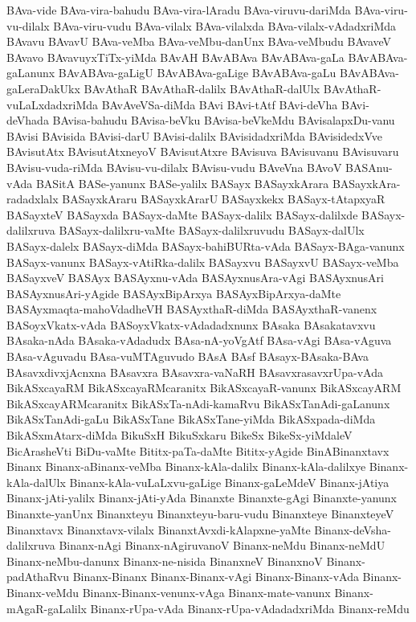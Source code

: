 {BAva-vide
BAva-vira-bahudu
BAva-vira-lAradu
BAva-viruvu-dariMda
BAva-viru-vu-dilalx
BAva-viru-vudu
BAva-vilalx
BAva-vilalxda
BAva-vilalx-vAdadxriMda
BAvavu
BAvavU
BAva-veMba
BAva-veMbu-danUnx
BAva-veMbudu
BAvaveV
BAvavo
BAvavuyxTiTx-yiMda
BAvAH
BAvABAva
BAvABAva-gaLa
BAvABAva-gaLanunx
BAvABAva-gaLigU
BAvABAva-gaLige
BAvABAva-gaLu
BAvABAva-gaLeraDakUkx
BAvAthaR
BAvAthaR-dalilx
BAvAthaR-dalUlx
BAvAthaR-vuLaLxdadxriMda
BAvAveVSa-diMda
BAvi
BAvi-tAtf
BAvi-deVha
BAvi-deVhada
BAvisa-bahudu
BAvisa-beVku
BAvisa-beVkeMdu
BAvisalapxDu-vanu
BAvisi
BAvisida
BAvisi-darU
BAvisi-dalilx
BAvisidadxriMda
BAvisidedxVve
BAvisutAtx
BAvisutAtxneyoV
BAvisutAtxre
BAvisuva
BAvisuvanu
BAvisuvaru
BAvisu-vuda-riMda
BAvisu-vu-dilalx
BAvisu-vudu
BAveVna
BAvoV
BASAnu-vAda
BASitA
BASe-yanunx
BASe-yalilx
BASayx
BASayxkArara
BASayxkAra-radadxlalx
BASayxkAraru
BASayxkArarU
BASayxkekx
BASayx-tAtapxyaR
BASayxteV
BASayxda
BASayx-daMte
BASayx-dalilx
BASayx-dalilxde
BASayx-dalilxruva
BASayx-dalilxru-vaMte
BASayx-dalilxruvudu
BASayx-dalUlx
BASayx-dalelx
BASayx-diMda
BASayx-bahiBURta-vAda
BASayx-BAga-vanunx
BASayx-vanunx
BASayx-vAtiRka-dalilx
BASayxvu
BASayxvU
BASayx-veMba
BASayxveV
BASAyx
BASAyxnu-vAda
BASAyxnusAra-vAgi
BASAyxnusAri
BASAyxnusAri-yAgide
BASAyxBipArxya
BASAyxBipArxya-daMte
BASAyxmaqta-mahoVdadheVH
BASAyxthaR-diMda
BASAyxthaR-vanenx
BASoyxVkatx-vAda
BASoyxVkatx-vAdadadxnunx
BAsaka
BAsakatavxvu
BAsaka-nAda
BAsaka-vAdadudx
BAsa-nA-yoVgAtf
BAsa-vAgi
BAsa-vAguva
BAsa-vAguvadu
BAsa-vuMTAguvudo
BAsA
BAsf
BAsayx-BAsaka-BAva
BAsavxdivxjAcnxna
BAsavxra
BAsavxra-vaNaRH
BAsavxrasavxrUpa-vAda
BikASxcayaRM
BikASxcayaRMcaranitx
BikASxcayaR-vanunx
BikASxcayARM
BikASxcayARMcaranitx
BikASxTa-nAdi-kamaRvu
BikASxTanAdi-gaLanunx
BikASxTanAdi-gaLu
BikASxTane
BikASxTane-yiMda
BikASxpada-diMda
BikASxmAtarx-diMda
BikuSxH
BikuSxkaru
BikeSx
BikeSx-yiMdaleV
BicArasheVti
BiDu-vaMte
Bititx-paTa-daMte
Bititx-yAgide
BinABinanxtavx
Binanx
Binanx-aBinanx-veMba
Binanx-kAla-dalilx
Binanx-kAla-dalilxye
Binanx-kAla-dalUlx
Binanx-kAla-vuLaLxvu-gaLige
Binanx-gaLeMdeV
Binanx-jAtiya
Binanx-jAti-yalilx
Binanx-jAti-yAda
Binanxte
Binanxte-gAgi
Binanxte-yanunx
Binanxte-yanUnx
Binanxteyu
Binanxteyu-baru-vudu
Binanxteye
BinanxteyeV
Binanxtavx
Binanxtavx-vilalx
BinanxtAvxdi-kAlapxne-yaMte
Binanx-deVsha-dalilxruva
Binanx-nAgi
Binanx-nAgiruvanoV
Binanx-neMdu
Binanx-neMdU
Binanx-neMbu-danunx
Binanx-ne-nisida
BinanxneV
BinanxnoV
Binanx-padAthaRvu
Binanx-Binanx
Binanx-Binanx-vAgi
Binanx-Binanx-vAda
Binanx-Binanx-veMdu
Binanx-Binanx-venunx-vAga
Binanx-mate-vanunx
Binanx-mAgaR-gaLalilx
Binanx-rUpa-vAda
Binanx-rUpa-vAdadadxriMda
Binanx-reMdu
}
